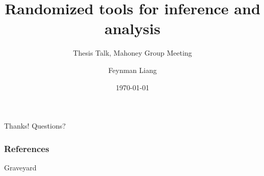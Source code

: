 \documentclass[11pt]{beamer}
\title{Randomized tools for inference and analysis}
\subtitle{Thesis Talk, Mahoney Group Meeting}
\author{Feynman Liang}
\institute{UC Berkeley}
\date{\today}
\begin{document}
\begin{frame}
\titlepage
\end{frame}

% 

% 



% 

% 

% 

% 

\begin{frame}
    \begin{center}
     Thanks! Questions?\par
    \end{center}
\end{frame}


\begin{frame}[allowframebreaks]
        \frametitle{References}
        \printbibliography
\end{frame}

\appendix


\begin{frame}
    \begin{center}
     Graveyard\par
    \end{center}
\end{frame}

\appendsubframes
\end{document}
